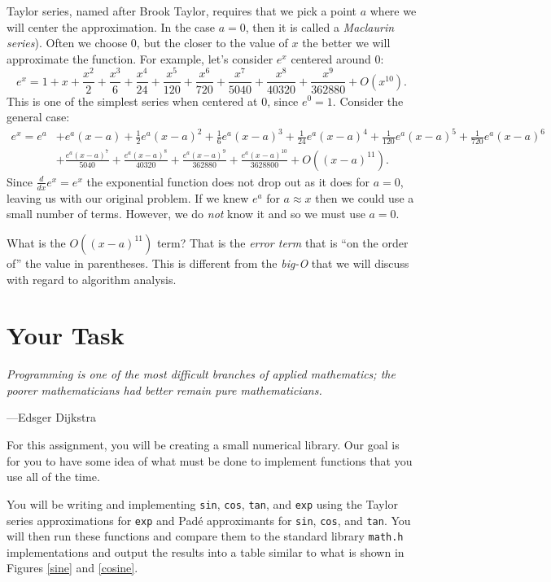\documentclass[11pt]{article}
\begin{document}
Taylor series, named after Brook Taylor, requires that we pick a point $a$ where we will center the approximation. In the case $a =0$, then it is called a \emph{Maclaurin series}).  Often we
choose $0$, but the closer to the value of $x$ the better we will
approximate the function. For example, let's consider $e^x$ centered
around $0$:
$$
e^x = 1  +x+\frac{x^2}{2}+\frac{x^3}{6}+\frac{x^4}{24}+\frac{x^5}{120}+\frac{x^6}{720}+\frac{x^7}
   {5040}+\frac{x^8}{40320}+\frac{x^9}{362880}+O\left(x^{10}\right
   ) .
$$
This is one of the simplest series when centered at $0$, since $e^0 = 1$.
Consider the general case:
\begin{align*}
e^x=e^a &+e^a (x-a)+\frac{1}{2} e^a (x-a)^2+\frac{1}{6} e^a (x-a)^3+\frac{1}{24} e^a
   (x-a)^4+\frac{1}{120} e^a (x-a)^5+\frac{1}{720} e^a (x-a)^6 \\
& +\frac{e^a
   (x-a)^7}{5040}+\frac{e^a (x-a)^8}{40320}+\frac{e^a (x-a)^9}{362880}+\frac{e^a
   (x-a)^{10}}{3628800}+O\left((x-a)^{11}\right) .
\end{align*}
Since $\frac{d}{dx}e^x=e^x$ the exponential function does not drop
out as it does for $a=0$, leaving us with our original problem. If we
knew $e^a$ for $a \approx x$ then we could use a small number of
terms. However, we do \emph{not} know it and so we must use $a=0$.

What is the $O\left((x-a)^{11}\right)$ term? That is the \emph{error term}
that is ``on the order of'' the value in parentheses. This is different from
the \emph{big-O} that we will discuss with regard to  algorithm analysis.


\section{Your Task}
\epigraph{\emph{Programming is one of the most difficult branches of applied
mathematics; the poorer mathematicians had better remain pure
mathematicians.}}{---Edsger Dijkstra}

\noindent For this assignment, you will be creating a small numerical library. Our goal is for you
to have some idea of what must be done to implement functions that
you use all of the time.

You will be writing and implementing \texttt{sin},
\texttt{cos}, \texttt{tan}, and \texttt{exp} using the Taylor series approximations for
\texttt{exp} and Pad\'e approximants for \texttt{sin}, \texttt{cos}, and
\texttt{tan}. You will then run these functions and compare them to the standard
library \texttt{math.h} implementations and output the results into a table similar to what is shown in
Figures \ref{sine} and \ref{cosine}.
\end{document}
